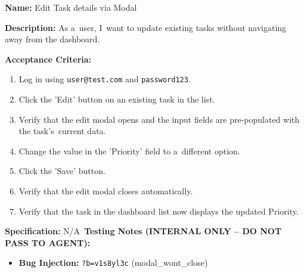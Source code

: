 \documentclass[czech, ing, kiv, he, iso690numb, viewonly]{fasthesis}
\begin{document}
\begin{tcolorbox}[breakable, colback=gray!4, colframe=black!35, boxrule=0.4pt, arc=2pt, boxsep=1pt, left=3pt, right=3pt, top=2pt, bottom=2pt, before skip=6pt, after skip=6pt, fontupper=\small, title={US-06 -- Edit Task details via Modal}]
\textbf{Name:} Edit Task details via Modal

\textbf{Description:} As a~user, I~want to update existing tasks without navigating away from the dashboard.

\textbf{Acceptance Criteria:}
\begin{enumerate}
    \item Log in using \texttt{user@test.com} and \texttt{password123}.
    \item Click the 'Edit' button on an existing task in the list.
    \item Verify that the edit modal opens and the input fields are pre-populated with the task's~current data.
    \item Change the value in the 'Priority' field to a~different option.
    \item Click the 'Save' button.
    \item Verify that the edit modal closes automatically.
    \item Verify that the task in the dashboard list now displays the updated Priority.
\end{enumerate}

\textbf{Specification:} N/A~\textbf{\textcolor{BrickRed}{Testing Notes (INTERNAL ONLY -- DO NOT PASS TO AGENT):}}
\begin{itemize}
    \item \textbf{Bug Injection:} \texttt{?b=v1s8yl3c} (modal\_wont\_close)
\end{itemize}
\end{tcolorbox}
\end{document}

